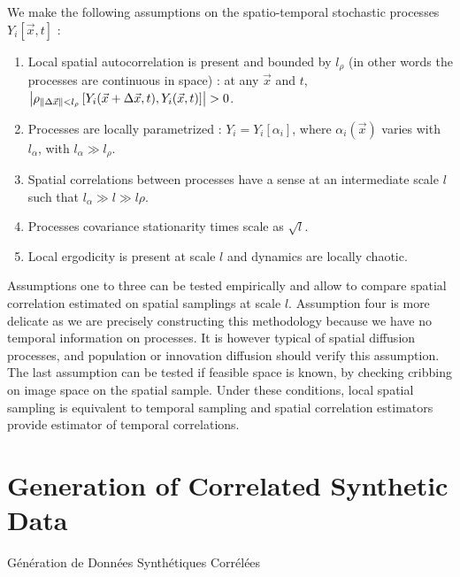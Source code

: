We make the following assumptions on the spatio-temporal stochastic processes $Y_i\left[\vec{x},t\right]$ :
\begin{enumerate}
\item Local spatial autocorrelation is present and bounded by $l_{\rho}$ (in other words the processes are continuous in space) : at any $\vec{x}$ and $t$, $\left|\rho_{\| \Delta \vec{x} \| < l_{\rho}}\left[Y_i (\vec{x}+\Delta \vec{x},t), Y_i (\vec{x},t) \right]\right| > 0$.
\item Processes are locally parametrized : $Y_i = Y_i\left[\alpha_i\right]$, where $\alpha_i (\vec{x})$ varies with $l_{\alpha}$, with $l_{\alpha} \gg l_{\rho}$.
\item Spatial correlations between processes have a sense at an intermediate scale $l$ such that $l_{\alpha}\gg l \gg l{\rho}$.
\item Processes covariance stationarity times scale as $\sqrt{l}$.
\item Local ergodicity is present at scale $l$ and dynamics are locally chaotic.
\end{enumerate}


Assumptions one to three can be tested empirically and allow to compare spatial correlation estimated on spatial samplings at scale $l$. Assumption four is more delicate as we are precisely constructing this methodology because we have no temporal information on processes. It is however typical of spatial diffusion processes, and population or innovation diffusion should verify this assumption. The last assumption can be tested if feasible space is known, by checking cribbing on image space on the spatial sample. Under these conditions, local spatial sampling is equivalent to temporal sampling and spatial correlation estimators provide estimator of temporal correlations.










\newpage



\section[Generation of Correlated Synthetic Data]{Generation of Correlated Synthetic Data}{Génération de Données Synthétiques Corrélées}




